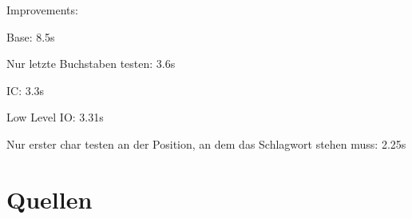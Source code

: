 \documentclass[ngerman, a4paper, footsepline, headsepline]{scrreport}
\begin{document}
	Improvements:
	
	Base: 8.5s
	
	Nur letzte Buchstaben testen: 3.6s
	
	IC: 3.3s
	
	Low Level IO: 3.31s
	
	Nur erster char testen an der Position, an dem das Schlagwort stehen muss: 2.25s 
	
	
	\chapter{Quellen}
	
	
	
	
	
	
\end{document}
